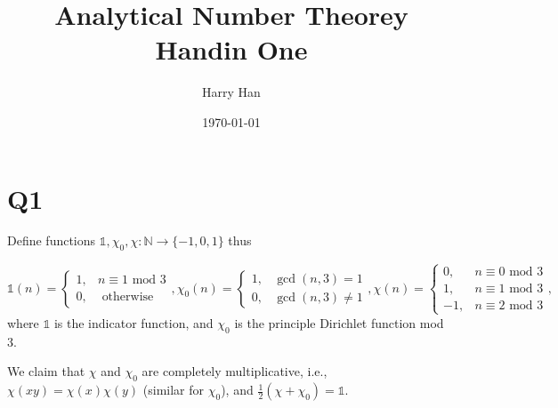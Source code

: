 \documentclass{article}
\title{Analytical Number Theorey Handin One}
\author{Harry Han}
\date{\today}
\theoremstyle{definition}
\theoremstyle{definition}
\theoremstyle{remark}
\renewcommand\mod{\text{ mod }}
\newcommand{\bb}[1]{\mathbb{#1}} %
\begin{document}
\maketitle

\section*{Q1}

Define functions $\mathbb{1}, \chi_0, \chi: \bb{N} \rightarrow \{-1,0,1\}$ thus 

\begin{equation}
	\mathbb{1}(n) = 
	\begin{cases}
		1,& n \equiv 1 \mod 3 \\ 
		0,& \text{ otherwise }
	\end{cases},
	\chi_0 (n) = 
	\begin{cases}
		1, & \gcd(n, 3) = 1 \\
		0, & \gcd(n, 3) \neq 1
	\end{cases},
	\chi(n) = 
	\begin{cases}
		0, & n \equiv 0 \mod 3 \\ 
		1, & n \equiv 1 \mod 3 \\ 
		-1, & n \equiv 2 \mod 3
	\end{cases},
\end{equation}
where $\mathbb{1}$ is the indicator function, and $\chi_0$ is the principle Dirichlet function mod 3.

We claim that $\chi$ and $ \chi_0$ are completely multiplicative, i.e., $\chi(xy) = \chi(x)\chi(y)$ (similar for $\chi_0$), and $\frac{1}{2}(\chi + \chi_0) = \mathbb{1}$.
\end{document}
